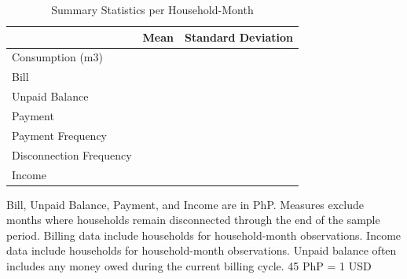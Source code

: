 \documentclass[12pt,table]{article}
\begin{document}
\begin{table}[h!] %
\centering
\caption{Summary Statistics per Household-Month}\label{table:descriptives_all}
\vspace{-2mm}
\begin{threeparttable}
\begin{tabular}{@{}l*{1}{KK}@{}}
\toprule
  & Mean & Standard Deviation \\
\midrule
Consumption (m3) &  &   \\
Bill &   &   \\
Unpaid Balance &   &   \\
Payment &   &   \\
Payment Frequency &   &   \\
Disconnection Frequency &   &   \\
Income &   &   \\
% 
\bottomrule
\end{tabular}
\begin{tablenotes}
\footnotesize
\item Bill, Unpaid Balance, Payment, and Income are in PhP.  Measures exclude months where households remain disconnected through the end of the sample period.  Billing data include households for household-month observations.  Income data include households for household-month observations.  Unpaid balance often includes any money owed during the current billing cycle.  45 PhP = 1 USD \,\,
\end{tablenotes}
\end{threeparttable}
\end{table}
\end{document}
